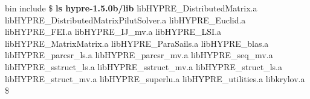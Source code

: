 \begin{ttfamily}
\begin{mdseries}
bin                       include\linebreak
\$ \textbf{ls hypre-1.5.0b/lib}\linebreak
libHYPRE\_DistributedMatrix.a\linebreak
libHYPRE\_DistributedMatrixPilutSolver.a\linebreak
libHYPRE\_Euclid.a\linebreak
libHYPRE\_FEI.a\linebreak
libHYPRE\_IJ\_mv.a\linebreak
libHYPRE\_LSI.a\linebreak
libHYPRE\_MatrixMatrix.a\linebreak
libHYPRE\_ParaSails.a\linebreak
libHYPRE\_blas.a\linebreak
libHYPRE\_parcsr\_ls.a\linebreak
libHYPRE\_parcsr\_mv.a\linebreak
libHYPRE\_seq\_mv.a\linebreak
libHYPRE\_sstruct\_ls.a\linebreak
libHYPRE\_sstruct\_mv.a\linebreak
libHYPRE\_struct\_ls.a\linebreak
libHYPRE\_struct\_mv.a\linebreak
libHYPRE\_superlu.a\linebreak
libHYPRE\_utilities.a\linebreak
libkrylov.a\linebreak
\$ \linebreak
\end{mdseries}
\end{ttfamily}
